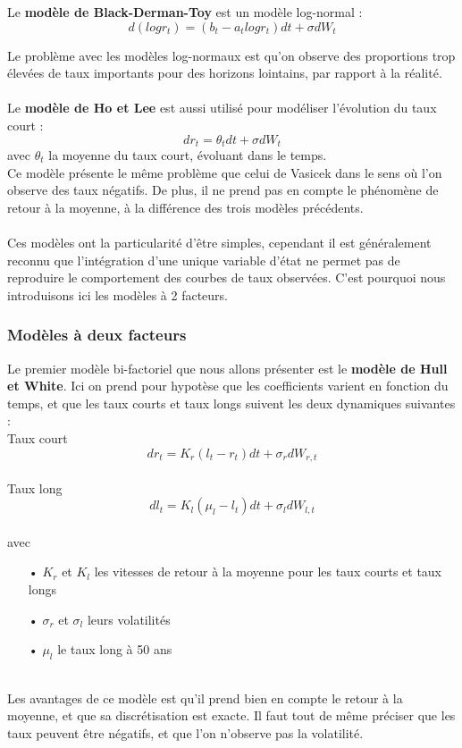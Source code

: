 \documentclass[french,12pt,a4paper]{article}
\begin{document}
Le \textbf{modèle de Black-Derman-Toy} est un modèle log-normal :
$$ d(logr_{t}) = (b_{t} - a_{t} logr_{t})dt + \sigma dW_{t} $$

Le problème avec les modèles log-normaux est qu'on observe des proportions trop élevées de taux importants pour des horizons lointains, par rapport à la réalité.\\ \\

Le \textbf{modèle de Ho et Lee} est aussi utilisé pour modéliser l'évolution du taux court : \\
$$ dr_{t} = \theta_{t}dt + \sigma dW_{t} $$
avec $\theta_{t}$ la moyenne du taux court, évoluant dans le temps. \\
Ce modèle présente le même problème que celui de Vasicek dans le sens où l'on observe des taux négatifs. De plus, il ne prend pas en compte le phénomène de retour à la moyenne, à la différence des trois modèles précédents.\\ \\

Ces modèles ont la particularité d'être simples, cependant il est généralement reconnu que l'intégration d'une unique variable d'état ne permet pas de reproduire le comportement des courbes de taux observées. C'est pourquoi nous introduisons ici les modèles à 2 facteurs.


\subsubsection{Modèles à deux facteurs}
Le premier modèle bi-factoriel que nous allons présenter est le \textbf{modèle de Hull et White}. Ici on prend pour hypotèse que les coefficients varient en fonction du temps, et que les taux courts et taux longs suivent les deux dynamiques suivantes : \\
Taux court
$$ dr_{t} = K_{r}(l_{t} - r_{t})dt + \sigma_{r}dW_{r,t} $$ \\
Taux long
$$ dl_{t} = K_{l}(\mu_{l} - l_{t})dt + \sigma_{l}dW_{l,t} $$ \\
avec
\begin{itemize}
\item[•] $K_{r}$ et $K_{l}$ les vitesses de retour à la moyenne pour les taux courts et taux longs
\item[•] $\sigma_{r}$ et $\sigma_{l}$ leurs volatilités
\item[•] $\mu_{l}$ le taux long à 50 ans
\end{itemize}
\\
Les avantages de ce modèle est qu'il prend bien en compte le retour à la moyenne, et que sa discrétisation est exacte. Il faut tout de même préciser que les taux peuvent être négatifs, et que l'on n'observe pas la volatilité. \\ \\
\end{document}
